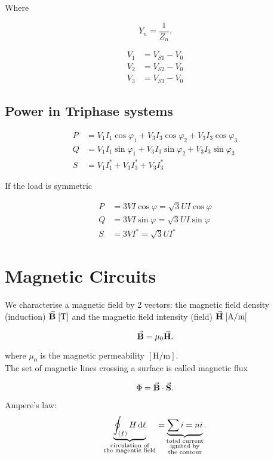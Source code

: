\documentclass{report}
\begin{document}
Where

\[
	Y_n = \frac{1}{Z_n}
	.\]

\begin{align*}
	V_1 & = V_{S1} - V_0 \\
	V_2 & = V_{S2} - V_0 \\
	V_3 & = V_{S3} - V_0
\end{align*}

\section{Power in Triphase systems}

\begin{align*}
	P & = V_1I_1\cos \varphi_1 + V_3I_3\cos \varphi_2 + V_3I_3\cos \varphi_3 \\
	Q & = V_1I_1\sin \varphi_1 + V_3I_3\sin \varphi_2 + V_3I_3\sin \varphi_3 \\
	S & = V_1I_1^* + V_3I_3^* + V_3I_3^*
\end{align*}

If the load is symmetric

\begin{align*}
	P & = 3VI \cos \varphi = \sqrt{3}UI \cos \varphi \\
	Q & = 3VI \sin \varphi = \sqrt{3}UI \sin \varphi \\
	S & = 3VI^* = \sqrt{3}UI^*
\end{align*}

\chapter{Magnetic Circuits}

We characterise a magnetic field by 2 vectors: the magnetic field density (induction) $\va{B}\; [\unit{\tesla}]$ and the magnetic field intensity (field) $\va{H}\; [\unit{\ampere\per\metre}]$

\[
	\va{B}= \mu_0 \va{H}
	.\]

where $\mu_0$ is the magnetic permeability $[\unit{\henry\per\metre}]$. \\

The set of magnetic lines crossing a surface is called magnetic flux

\[
	\Phi = \va{B}\cdot\va{S}
	.\]

Ampere's law:
\[
	\underbrace{\oint_{(f)} H \dd{\ell}}_{\substack{\text{circulation of}\\ \text{the magentic field}}}
	=
	\underbrace{\sum i = ni}_{\mathclap{\substack{\text{total current}\\ \text{ignited by}\\ \text{the contour}}}}
	.\]
\end{document}
